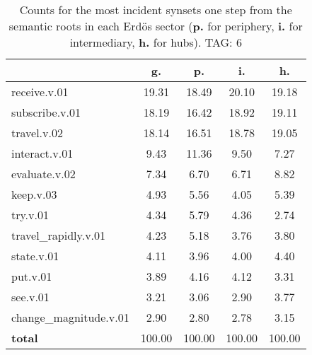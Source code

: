 \begin{table}[h!]
\begin{center}
\begin{tabular}{| l || c | c | c | c |}\hline
 & {\bf g.} & {\bf p.} & {\bf i.} & {\bf h.} \\\hline\hline
receive.v.01 & 19.31  & 18.49  & 20.10  & 19.18 \\\hline
subscribe.v.01 & 18.19  & 16.42  & 18.92  & 19.11 \\\hline
travel.v.02 & 18.14  & 16.51  & 18.78  & 19.05 \\\hline
interact.v.01 & 9.43  & 11.36  & 9.50  & 7.27 \\\hline
evaluate.v.02 & 7.34  & 6.70  & 6.71  & 8.82 \\\hline
keep.v.03 & 4.93  & 5.56  & 4.05  & 5.39 \\\hline
try.v.01 & 4.34  & 5.79  & 4.36  & 2.74 \\\hline
travel\_rapidly.v.01 & 4.23  & 5.18  & 3.76  & 3.80 \\\hline
state.v.01 & 4.11  & 3.96  & 4.00  & 4.40 \\\hline
put.v.01 & 3.89  & 4.16  & 4.12  & 3.31 \\\hline
see.v.01 & 3.21  & 3.06  & 2.90  & 3.77 \\\hline
change\_magnitude.v.01 & 2.90  & 2.80  & 2.78  & 3.15 \\\hline\hline
{{\bf total}} & 100.00  & 100.00  & 100.00  & 100.00 \\\hline
\end{tabular}
\caption{Counts for the most incident synsets one step from the semantic roots in each Erd\"os sector ({\bf p.} for periphery, {\bf i.} for intermediary, {\bf h.} for hubs). TAG: 6}
\end{center}
\end{table}